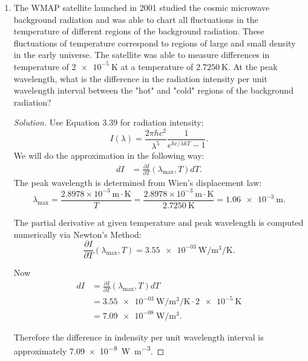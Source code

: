 \begin{enumerate}
\item
The WMAP satellite launched in 2001 studied the cosmic microwave background radiation and was able to chart all fluctuations in the
temperature of different regions of the background radiation. These fluctuations of temperature correspond to regions of large and small density in the early universe. The satellite was able to measure differences in temperature of $\SI{2e-5}{\kelvin}$ at a temperature of $2.7250 \mathrm{~K}$. At the peak wavelength, what is the difference in the radiation intensity per unit wavelength interval between the "hot" and "cold" regions of the background radiation?
\begin{proof}[Solution]
	Use Equation 3.39 for radiation intensity: \[
		I(\lambda)=\frac{2 \pi h c^2}{\lambda^5} \frac{1}{e^{h c / \lambda k T}-1}
	.\] 
	We will do the approximation in the following way:
	\begin{align*}
		dI &= \frac{\partial I}{\partial T}(\lambda_{\max}, T) dT
	.\end{align*}
	The peak wavelength is determined from Wien's displacement law:
	\[
		\lambda_{\max} 
		= \frac{2.8978 \times 10^{-3} \mathrm{~m} \cdot \mathrm{K}}{T}	
		= \frac{2.8978 \times 10^{-3} \mathrm{~m} \cdot \mathrm{K}}{2.7250 \mathrm{~K}}	
		= \SI{1.06e-3}{\metre}
.\] 

	The partial derivative at given temperature and peak wavelength is computed numerically via Newton's Method:
	\[
		\frac{\partial I}{\partial T} (\lambda_{\max}, T) = \SI{3.55e-03}{\watt\per\metre\cubed\per\kelvin}
	.\] 

Now
\begin{align*}
	dI &= \frac{\partial I}{\partial T}(\lambda_{\max}, T) dT\\
	&=  \SI{3.55e-03}{\watt\per\metre\cubed\per\kelvin} \cdot
	\SI{2e-5}{\kelvin}\\
	&= \SI{7.09e-08}{\watt\per\metre\cubed}
.\end{align*}

Therefore the difference in indensity per unit wavelength interval is approximately  \SI{7.09e-8}{\watt \per \metre \cubed}.
\end{proof}


\end{enumerate}
